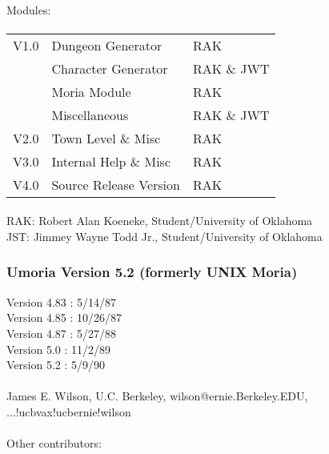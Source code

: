 \paragraph{}
Modules:

\paragraph{}
\begin{tabular}{rll}
     V1.0 & Dungeon Generator      & RAK\\
          & Character Generator    & RAK \& JWT\\
          & Moria Module           & RAK\\
          & Miscellaneous          & RAK \& JWT\\
     V2.0 & Town Level \& Misc     & RAK\\
     V3.0 & Internal Help \& Misc  & RAK\\
     V4.0 & Source Release Version & RAK\\
\end{tabular}

\paragraph{}
RAK: Robert Alan Koeneke, Student/University of
Oklahoma \\
JST: Jimmey Wayne Todd Jr., Student/University of Oklahoma

\subsubsection{Umoria Version 5.2 (formerly UNIX Moria)}
Version 4.83 :  5/14/87\\
Version 4.85 : 10/26/87\\
Version 4.87 :  5/27/88\\
Version 5.0  :  11/2/89\\
Version 5.2  :   5/9/90

\paragraph{}
James E. Wilson, U.C. Berkeley,
wilson@ernie.Berkeley.EDU, ...!ucbvax!ucbernie!wilson

\paragraph{}
Other contributors:
